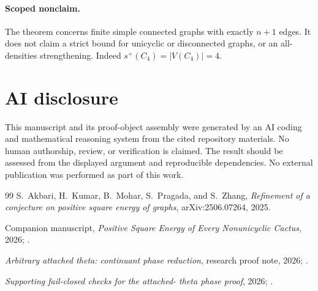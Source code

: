 \documentclass[11pt]{article}
\theoremstyle{remark}
\newcommand{\splus}{s^+}
\begin{document}
\paragraph{Scoped nonclaim.}
The theorem concerns finite simple connected graphs with exactly $n+1$ edges.
It does not claim a strict bound for unicyclic or disconnected graphs, or an
all-densities strengthening.  Indeed $\splus(C_4)=|V(C_4)|=4$.

\section*{AI disclosure}
This manuscript and its proof-object assembly were generated by an AI coding
and mathematical reasoning system from the cited repository materials.  No
human authorship, review, or verification is claimed.  The result should be
assessed from the displayed argument and reproducible dependencies.  No
external publication was performed as part of this work.

\begin{thebibliography}{99}
 S.~Akbari, H.~Kumar, B.~Mohar, S.~Pragada, and S.~Zhang,
\emph{Refinement of a conjecture on positive square energy of graphs},
arXiv:2506.07264, 2025.

 Companion manuscript, \emph{Positive Square Energy of Every
Nonunicyclic Cactus}, 2026; .

 \emph{Arbitrary attached theta: continuant phase
reduction}, research proof note, 2026;
.

 \emph{Supporting fail-closed checks for the attached-
theta phase proof}, 2026;
.
\end{thebibliography}
\end{document}
